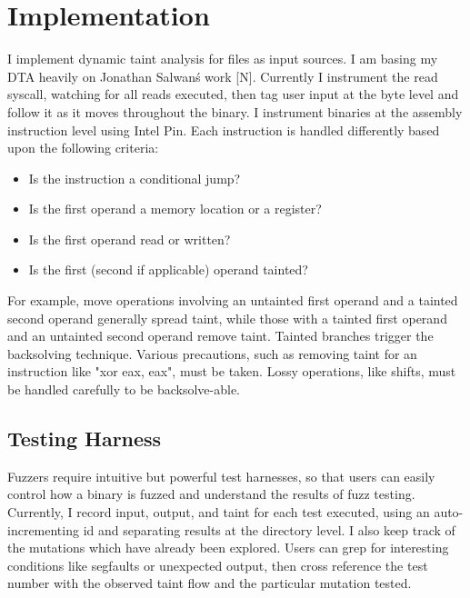 \documentclass[11pt,expanded,copyright]{fsuthesis}
\begin{document}
\chapter{Implementation}

I implement dynamic taint analysis for files as input sources. I am basing my DTA heavily on Jonathan Salwan\'s work [N]. Currently I instrument the read syscall, watching for all reads executed, then tag user input at the byte level and follow it as it moves throughout the binary. I instrument binaries at the assembly instruction level using Intel Pin. Each instruction is handled differently based upon the following criteria:

\begin{itemize}
	\item Is the instruction a conditional jump?
	\item Is the first operand a memory location or a register?
	\item Is the first operand read or written?
	\item Is the first (second if applicable) operand tainted?
\end{itemize}
	
For example, move operations involving an untainted first operand and a tainted second operand generally spread taint, while those with a tainted first operand and an untainted second operand remove taint. Tainted branches trigger the backsolving technique. Various precautions, such as removing taint for an instruction like "xor eax, eax", must be taken. Lossy operations, like shifts, must be handled carefully to be backsolve-able.
	
\section{Testing Harness}

Fuzzers require intuitive but powerful test harnesses, so that users can easily control how a binary is fuzzed and understand the results of fuzz testing. Currently, I record input, output, and taint for each test executed, using an auto-incrementing id and separating results at the directory level. I also keep track of the mutations which have already been explored. Users can grep for interesting conditions like segfaults or unexpected output, then cross reference the test number with the observed taint flow and the particular mutation tested.

\end{document}
